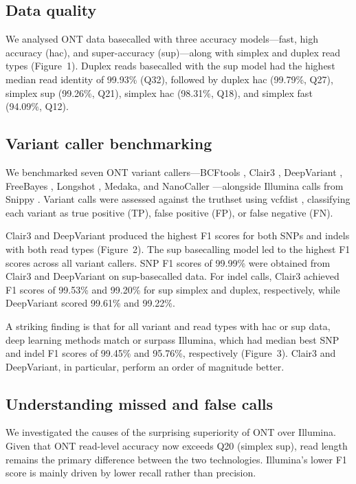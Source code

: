 \documentclass[11pt]{article}
\begin{document}
\subsection{Data quality}

We analysed ONT data basecalled with three accuracy models---fast, high accuracy (hac), and super-accuracy (sup)---along with simplex and duplex read types (Figure~1). Duplex reads basecalled with the sup model had the highest median read identity of 99.93\% (Q32), followed by duplex hac (99.79\%, Q27), simplex sup (99.26\%, Q21), simplex hac (98.31\%, Q18), and simplex fast (94.09\%, Q12).

\subsection{Variant caller benchmarking}

We benchmarked seven ONT variant callers---BCFtools \citep{danecek2021}, Clair3 \citep{zheng2022}, DeepVariant \citep{poplin2018}, FreeBayes \citep{garrison2012}, Longshot \citep{edge2019}, Medaka, and NanoCaller \citep{ahsan2021}---alongside Illumina calls from Snippy \citep{seemann2015}. Variant calls were assessed against the truthset using vcfdist \citep{shaw2021}, classifying each variant as true positive (TP), false positive (FP), or false negative (FN).

Clair3 and DeepVariant produced the highest F1 scores for both SNPs and indels with both read types (Figure~2). The sup basecalling model led to the highest F1 scores across all variant callers. SNP F1 scores of 99.99\% were obtained from Clair3 and DeepVariant on sup-basecalled data. For indel calls, Clair3 achieved F1 scores of 99.53\% and 99.20\% for sup simplex and duplex, respectively, while DeepVariant scored 99.61\% and 99.22\%.

A striking finding is that for all variant and read types with hac or sup data, deep learning methods match or surpass Illumina, which had median best SNP and indel F1 scores of 99.45\% and 95.76\%, respectively (Figure~3). Clair3 and DeepVariant, in particular, perform an order of magnitude better.

\subsection{Understanding missed and false calls}

We investigated the causes of the surprising superiority of ONT over Illumina. Given that ONT read-level accuracy now exceeds Q20 (simplex sup), read length remains the primary difference between the two technologies. Illumina's lower F1 score is mainly driven by lower recall rather than precision.
\end{document}
